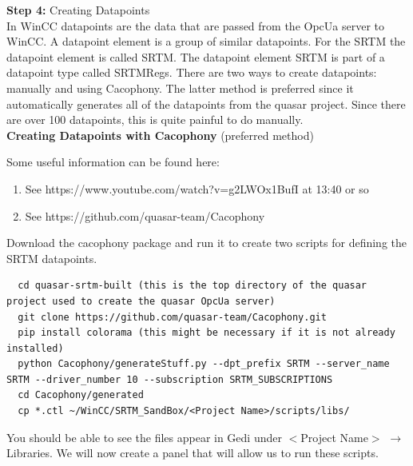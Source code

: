 \documentclass[11pt,a4paper]{article}
\begin{document}
\noindent\textbf{Step 4:} Creating Datapoints\\

\noindent In WinCC datapoints are the data that are passed from the OpcUa server to WinCC. A datapoint element is a group of similar datapoints. For the SRTM the datapoint element is called SRTM. The datapoint element SRTM is part of a datapoint type called SRTMRegs. There are two ways to create datapoints: manually and using Cacophony. The latter method is preferred since it automatically generates all of the datapoints from the quasar project. Since there are over 100 datapoints, this is quite painful to do manually. \\

\noindent\textbf{Creating Datapoints with Cacophony} (preferred method)

\bigskip
\noindent Some useful information can be found here:
\begin{enumerate}
  \item See https://www.youtube.com/watch?v=g2LWOx1BufI at 13:40 or so
  \item See https://github.com/quasar-team/Cacophony
\end{enumerate}

\noindent Download the cacophony package and run it to create two scripts for defining the SRTM datapoints.
\begin{lstlisting}
  cd quasar-srtm-built (this is the top directory of the quasar project used to create the quasar OpcUa server)
  git clone https://github.com/quasar-team/Cacophony.git
  pip install colorama (this might be necessary if it is not already installed)
  python Cacophony/generateStuff.py --dpt_prefix SRTM --server_name SRTM --driver_number 10 --subscription SRTM_SUBSCRIPTIONS
  cd Cacophony/generated
  cp *.ctl ~/WinCC/SRTM_SandBox/<Project Name>/scripts/libs/
\end{lstlisting}

\noindent You should be able to see the files appear in Gedi under $<$Project Name$>$ $\to$ Libraries.
We will now create a panel that will allow us to run these scripts.
\end{document}
